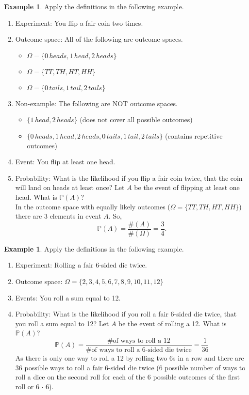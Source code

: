 \documentclass[12pt]{article}
\newcommand{\bbP}{\mathbb{P}}
\renewcommand{\_}[1]{\underline{ #1 }}
\theoremstyle{definition}
\newtheorem{example}[theorem]{Example}
\numberwithin{equation}{subsection}
\begin{document}
\begin{example} Apply the definitions in the following example.
	\begin{enumerate}
		\item Experiment: You flip a fair coin two times.
		\item Outcome space: All of the following are outcome spaces.
			\begin{itemize}
			\item  $\Omega =\{0\, heads, 1\, head, 2\, heads\}$
			\item  $\Omega =\{TT, TH, HT, HH\}$
			\item $\Omega =\{ 0\, tails, 1\, tail, 2\, tails\}$
			\end{itemize}
		\item Non-example: The following are NOT outcome spaces.
			\begin{itemize}
			\item $\{1\, head, 2\, heads\}$ (does not cover all possible outcomes)
			\item $\{0\, heads, 1\, head, 2\, heads, 0\, tails, 1\, tail, 2\, tails \}$ (contains repetitive outcomes)
			\end{itemize}
		\item Event: You flip at least one head.
		\item Probability: What is the likelihood if you flip a fair coin twice, that the coin will land on heads at least once? Let $A$ be the event of flipping at least one head. What is $\bbP(A)$?\\ In the outcome space with equally likely outcomes ($\Omega =\{TT, TH, HT, HH\}$) there are 3 elements in event $A$. So, $$\bbP(A)=\dfrac{\#(A)}{\#(\Omega)}=\dfrac{3}{4}.$$
	\end{enumerate}
\end{example}

\begin{example}
Apply the definitions in the following example.
\begin{enumerate}
    \item Experiment: Rolling a fair 6-sided die twice.
    \item Outcome space: $\Omega =\{2, 3, 4, 5, 6, 7, 8, 9, 10, 11, 12\}$
    \item Events: You roll a sum equal to 12.
    \item Probability: What is the likelihood if you roll a fair 6-sided die twice, that you roll a sum equal to 12? Let $A$ be the event of rolling a 12. What is $\bbP(A)$? \\
		\[\bbP(A)=\frac{\text{\# of ways to roll a 12}}{\text{\# of ways to roll a 6-sided die twice}}=\frac{1}{36}\]
    As there is only one way to roll a 12 by rolling two 6s in a row and there are 36 possible ways to roll a fair 6-sided die twice (6 possible number of ways to roll a dice on the second roll for each of the 6 possible outcomes of the first roll or 6 $\cdot$ 6).
\end{enumerate}
\end{example}
\end{document}
